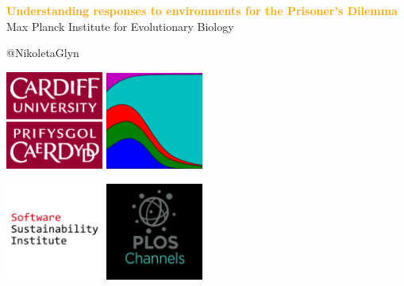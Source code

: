 \documentclass{beamer}
\begin{document}
\begin{frame}
    \begin{center}
        \LARGE{\textbf{\textcolor{orange}{Understanding responses to environments for the Prisoner's Dilemma}}} \\

        \vspace{1.5cm}
        \normalsize{Max Planck Institute for Evolutionary Biology}

        \vspace{1cm}
        \normalsize{@NikoletaGlyn}

    \end{center}
\end{frame}

\begin{frame}
    \begin{center}
    \includegraphics[width=0.24\textwidth]{static/cardiff_uni_logo.png}\hspace{6pt}
    \includegraphics[width=0.24\textwidth, height=0.245\textwidth]{static/axelrod-logo.png}\vspace{10pt}

    \hspace{2pt}\includegraphics[width=0.24\textwidth]{static/ssi-logo.png} \hspace{1pt}
    \includegraphics[width=0.24\textwidth]{static/plos-logo.jpg}

    \end{center}
\end{frame}
\end{document}

